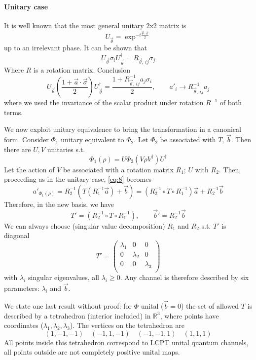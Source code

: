 \documentclass[a4paper, 11pt]{article}
\begin{document}
	\paragraph{Unitary case} It is well known that the most general unitary 2x2 matrix is 
	\[ U_{\vec{\theta}} = \exp^{-i\frac{\vec{\theta}\cdot\vec{\sigma}}{2}} \]
	up to an irrelevant phase. It can be shown that
	\[ U_{\vec{\theta}} \sigma_i U_{\vec{\theta}}^\dagger = R_{\vec{\theta},\,ij} \sigma_j \]
	Where $R$ is a rotation matrix. Conclusion
	\[ U_{\vec{\theta}} \left(\dfrac{1+\vec{a}\cdot\vec{\sigma}}{2}\right) U_{\vec{\theta}}^\dagger = \dfrac{1+R^{-1}_{\vec{\theta},\,ij} a_j \sigma_i}{2}, \qquad a'_i\rightarrow R^{-1}_{\vec{\theta},\,ij} a_j \]
	where we used the invariance of the scalar product under rotation $R^{-1}$ of both terms.
	\vspace{5mm}
	
	We now exploit unitary equivalence to bring the transformation in a canonical form. Consider $\Phi_1$ unitary equivalent to $\Phi_2$. Let $\Phi_2$ be associated with $T$, $\vec{b}$. Then there are $U,V$ unitaries s.t.
	\begin{equation}
	\label{eq:8}
	\Phi_1(\rho) = U \Phi_2(V\rho V^\dagger) U^\dagger
	\end{equation}
	Let the action of $V$ be associated with a rotation matrix $R_1$; $U$ with $R_2$. Then, proceeding as in the unitary case, \ref{eq:8} becomes
	\[ a'_{\Phi_1(\rho)} = R_2^{-1} \left( T(R_1^{-1} \vec{a}) + \vec{b} \right) = (R_2^{-1}\circ T\circ R_1^{-1}) \vec{a} + R_2^{-1} \vec{b} \]
	Therefore, in the new basis, we have
	\[ T' = (R_2^{-1}\circ T\circ R_1^{-1}),\qquad \vec{b}' = R_2^{-1} \vec{b} \]
	We can always choose (singular value decomposition) $R_1$ and $R_2$ s.t. $T'$ is diagonal
	\[ T' = \begin{pmatrix}
	\lambda_1 & 0 & 0 \\
	0 & \lambda_2 & 0 \\
	0 & 0 & \lambda_3 \\
	\end{pmatrix} \]
	with $\lambda_i$ singular eigenvalues, all $\lambda_i \ge 0$. Any channel is therefore described by six parameters:
	$\lambda_i$ and $\vec{b}$.
	
	
	We state one last result without proof: for $\Phi$ unital ($\vec{b}=0$) the set of allowed $T$ is described by a tetrahedron (interior included) in $\mathbb{R}^3$, where points have coordinates ($\lambda_1,\lambda_2,\lambda_3$). The vertices on the tetrahedron are
	\[ (1,-1,-1)\quad (-1,1,-1)\quad (-1,-1,1)\quad (1,1,1) \]
	All points inside this tetrahedron correspond to LCPT unital quantum channels, all points outside are not completely positive unital maps.
	
\end{document}

